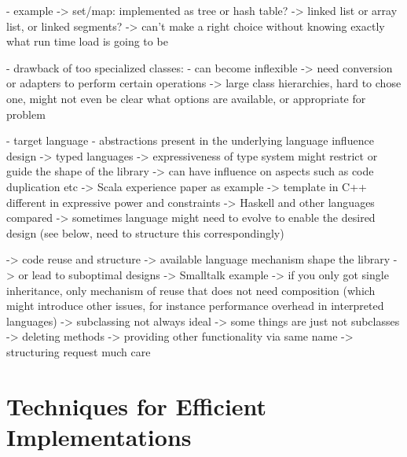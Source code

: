 \documentclass[sigconf, 10pt]{acmart}
\begin{document}
\begin{note}
      - example
        -> set/map: implemented as tree or hash table?
        -> linked list or array list, or linked segments?
        -> can't make a right choice without knowing exactly what
           run time load is going to be

    - drawback of too specialized classes:
      - can become inflexible
        -> need conversion or adapters to perform certain operations
        -> large class hierarchies, hard to chose one, might not even be
           clear what options are available, or appropriate for problem
     

- target language
 - abstractions present in the underlying language influence design
   -> typed languages
     -> expressiveness of type system might restrict or guide the shape
        of the library
     -> can have influence on aspects such as code duplication etc
     -> Scala experience paper as example
     -> template in C++ different in expressive power and constraints
     -> Haskell and other languages compared \citep{Garcia:2007}
       -> sometimes language might need to evolve to enable the desired design \citep{Chakravarty:2005:ATC} \citep{Black:2003:ATS} (see below, need to structure this correspondingly)
       
  -> code reuse and structure
    -> available language mechanism shape the library
    -> or lead to suboptimal designs
     -> Smalltalk example \citep{Cook:1992:ISS}
       -> if you only got single inheritance, only mechanism of reuse
          that does not need composition (which might introduce other issues,
          for instance performance overhead in interpreted languages)
       -> subclassing not always ideal
       -> some things are just not subclasses
         -> deleting methods
         -> providing other functionality via same name
         -> structuring request much care
         
       
  
\end{note}


\section{Techniques for Efficient Implementations}
\end{document}
